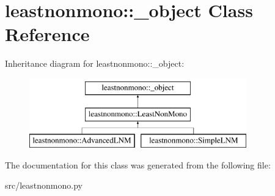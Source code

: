\hypertarget{classleastnonmono_1_1__object}{
\section{leastnonmono::\_\-object Class Reference}
\label{d0/dee/classleastnonmono_1_1__object}
}
Inheritance diagram for leastnonmono::\_\-object:\begin{figure}[H]
\begin{center}
\leavevmode
\includegraphics[height=3cm]{d0/dee/classleastnonmono_1_1__object}
\end{center}
\end{figure}


The documentation for this class was generated from the following file:\begin{DoxyCompactItemize}
\item 
src/leastnonmono.py\end{DoxyCompactItemize}
